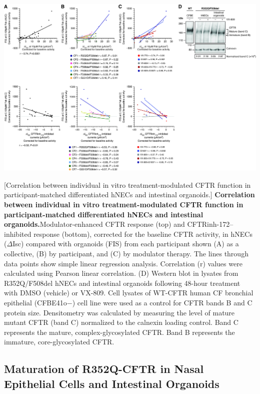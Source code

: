 \begin{center}
	\includegraphics[width=1.00\textwidth]{figures/R352Q/figure_3.jpg}
\end{center}
\begingroup
{}[Correlation between individual in vitro treatment-modulated CFTR function in participant-matched differentiated hNECs and intestinal organoids.] {\textbf{Correlation between individual in vitro treatment-modulated CFTR function in participant-matched differentiated hNECs and intestinal organoids.}}{Modulator-enhanced CFTR response (top) and CFTRinh-172–inhibited response (bottom), corrected for the baseline CFTR activity, in hNECs ($\Delta$Isc) compared with organoids (FIS) from each participant shown (A) as a collective, (B) by participant, and (C) by modulator therapy. The lines through data points show simple linear regression analysis. Correlation (r) values were calculated using Pearson linear correlation. (D) Western blot in lysates from R352Q/F508del hNECs and intestinal organoids following 48-hour treatment with DMSO (vehicle) or VX-809. Cell lysates of WT-CFTR human CF bronchial epithelial (CFBE41o−) cell line were used as a control for CFTR bands B and C protein size. Densitometry was calculated by measuring the level of mature mutant CFTR (band C) normalized to the calnexin loading control. Band C represents the mature, complex-glycosylated CFTR. Band B represents the immature, core-glycosylated CFTR.}
\label{R352Q_figure_3}
\endgroup

\subsection{Maturation of R352Q-CFTR in Nasal Epithelial Cells and Intestinal Organoids}

